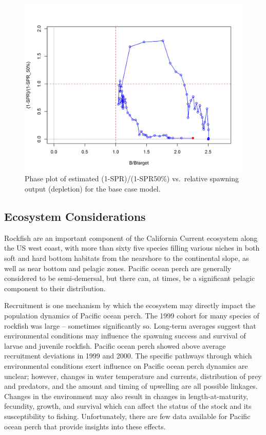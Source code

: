 \documentclass[12pt,]{article}
\begin{document}
\begin{figure}
\centering
\includegraphics{r4ss/plots_mod1/SPR4_phase.png}
\caption{Phase plot of estimated (1-SPR)/(1-SPR50\%) vs.~relative
spawning output (depletion) for the base case
model.\label{fig:Phase_all}}
\end{figure}

\FloatBarrier

\subsection*{Ecosystem Considerations}\label{ecosystem-considerations}

Rockfish are an important component of the California Current ecosystem
along the US west coast, with more than sixty five species filling
various niches in both soft and hard bottom habitats from the nearshore
to the continental slope, as well as near bottom and pelagic zones.
Pacific ocean perch are generally considered to be semi-demersal, but
there can, at times, be a significant pelagic component to their
distribution.

Recruitment is one mechanism by which the ecosystem may directly impact
the population dynamics of Pacific ocean perch. The 1999 cohort for many
species of rockfish was large -- sometimes significantly so. Long-term
averages suggest that environmental conditions may influence the
spawning success and survival of larvae and juvenile rockfish. Pacific
ocean perch showed above average recruitment deviations in 1999 and
2000. The specific pathways through which environmental conditions exert
influence on Pacific ocean perch dynamics are unclear; however, changes
in water temperature and currents, distribution of prey and predators,
and the amount and timing of upwelling are all possible linkages.
Changes in the environment may also result in changes in
length-at-maturity, fecundity, growth, and survival which can affect the
status of the stock and its susceptibility to fishing. Unfortunately,
there are few data available for Pacific ocean perch that provide
insights into these effects.
\end{document}
